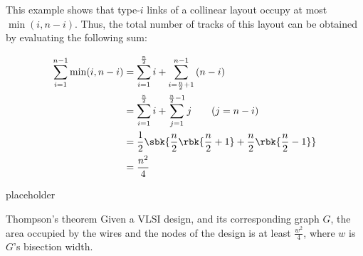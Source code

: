 \documentclass[a4paper, 12pt]{report}
\begin{document}
    This example shows that type-$i$ links of a collinear layout occupy at most $\min(i, n - i)$. Thus, the total number of tracks of this layout can be obtained by evaluating the following sum:
    
    \begin{equation*}
        \begin{split}
            \sum_{i = 1}^{n - 1}{\min(i, n - i)} &= \sum_{i = 1}^{\frac{n}{2}}{i} + \sum_{i = \frac{n}{2} + 1}^{n - 1}{(n - i)} \\
                                                 &= \sum_{i = 1}^\frac{n}{2}{i} + \sum_{j = 1}^{\frac{n}{2} - 1}{j} \quad \quad (j = n - i) \\
                                                 &= \dfrac{1}{2}\sbk{\dfrac{n}{2} \rbk{\dfrac{n}{2} + 1} + \dfrac{n}{2}\rbk{\dfrac{n}{2} - 1}} \\
                                                 &= \dfrac{n^2}{4}
        \end{split}
    \end{equation*}

    placeholder 

    \begin{framedthm}{Thompson's theorem}
        Given a VLSI design, and its corresponding graph $G$, the area occupied by the wires and the nodes of the design is at least $\frac{w^2}{4}$, where $w$ is $G$'s bisection width.
    \end{framedthm}
\end{document}
